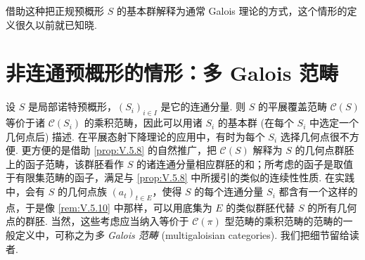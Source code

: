 \begin{remarkstar}
借助这种把正规预概形 $S$ 的基本群解释为通常 Galois 理论的方式，这个情形的定义很久以前就已知晓.
\end{remarkstar}

\section{非连通预概形的情形：多 Galois 范畴}

设 $S$ 是局部诺特预概形，$(S_i)_{i \in I}$ 是它的连通分量. 则 $S$ 的平展覆盖范畴 $\mathcal{C}(S)$ 等价于诸 $\mathcal{C}(S_i)$ 的乘积范畴，因此可以用诸 $S_i$ 的基本群 (在每个 $S_i$ 中选定一个几何点后) 描述. 在平展态射下降理论的应用中，有时为每个 $S_i$ 选择几何点很不方便. 更方便的是借助 \ref{prop:V.5.8} 的自然推广，把 $\mathcal{C}(S)$ 解释为 $S$ 的几何点群胚上的函子范畴，该群胚看作 $S$ 的诸连通分量相应群胚的和；所考虑的函子是取值于有限集范畴的函子，满足与 \ref{prop:V.5.8} 中所援引的类似的连续性性质. 在实践中，会有 $S$ 的几何点族 $(a_t)_{t \in E}$，使得 $S$ 的每个连通分量 $S_i$ 都含有一个这样的点，于是像 \ref{rem:V.5.10} 中那样，可以用底集为 $E$ 的类似群胚代替 $S$ 的所有几何点的群胚. 当然，这些考虑应当纳入等价于 $\mathcal{C}(\pi)$ 型范畴的乘积范畴的范畴的一般定义中，可称之为\emph{多 Galois 范畴} (multigaloisian categories). 我们把细节留给读者.

